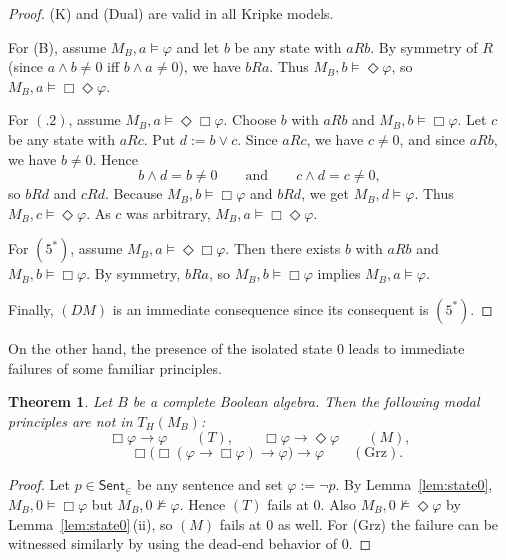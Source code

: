 \documentclass[11pt]{amsart}
\theoremstyle{definition}
\theoremstyle{plain}
\newtheorem{theorem}[definition]{Theorem}
\newcommand{\Sent}{\mathsf{Sent}}
\begin{document}
\begin{proof}
(K) and (Dual) are valid in all Kripke models.

For (B), assume $M_B,a\models \varphi$ and let $b$ be any state with $aRb$.
By symmetry of $R$ (since $a\wedge b\neq 0$ iff $b\wedge a\neq 0$), we have $bRa$.
Thus $M_B,b\models \Diamond\varphi$, so $M_B,a\models \Box\Diamond\varphi$.

For $(.2)$, assume $M_B,a\models \Diamond\Box\varphi$.
Choose $b$ with $aRb$ and $M_B,b\models \Box\varphi$.
Let $c$ be any state with $aRc$.
Put $d:=b\vee c$.
Since $aRc$, we have $c\neq 0$, and since $aRb$, we have $b\neq 0$.
Hence
\[
b\wedge d=b\neq 0
\qquad\text{and}\qquad
c\wedge d=c\neq 0,
\]
so $bRd$ and $cRd$.
Because $M_B,b\models \Box\varphi$ and $bRd$, we get $M_B,d\models \varphi$.
Thus $M_B,c\models \Diamond\varphi$.
As $c$ was arbitrary, $M_B,a\models \Box\Diamond\varphi$.



For $(5^\ast)$, assume $M_B,a\models \Diamond\Box\varphi$.
Then there exists $b$ with $aRb$ and $M_B,b\models \Box\varphi$.
By symmetry, $bRa$, so $M_B,b\models \Box\varphi$ implies $M_B,a\models \varphi$.



Finally, $(DM)$ is an immediate consequence since its consequent is $(5^\ast)$.
\end{proof}

On the other hand, the presence of the isolated state $0$ leads to immediate failures of some familiar principles.

\begin{theorem}\label{thm:general-fail}
Let $B$ be a complete Boolean algebra. Then the following modal principles are not in $T_H(M_B)$:
\[
\Box\varphi \to \varphi \qquad (T),
\qquad
\Box\varphi\to\Diamond\varphi \qquad (M),
\]
\[
\quad
\Box\bigl(\Box(\varphi\to \Box\varphi)\to \varphi\bigr)\to \varphi \qquad (\mathrm{Grz}).
\]
\end{theorem}

\begin{proof}
Let $p\in\Sent_{\in}$ be any sentence and set $\varphi:=\neg p$.
By Lemma~\ref{lem:state0}, $M_B,0\models \Box\varphi$ but $M_B,0\not\models \varphi$.
Hence $(T)$ fails at $0$.
Also $M_B,0\not\models \Diamond\varphi$ by Lemma~\ref{lem:state0}$\,$(ii), so $(M)$ fails at $0$ as well.
For (Grz) the failure can be witnessed similarly by using the dead-end behavior of $0$.
\end{proof}
\end{document}
